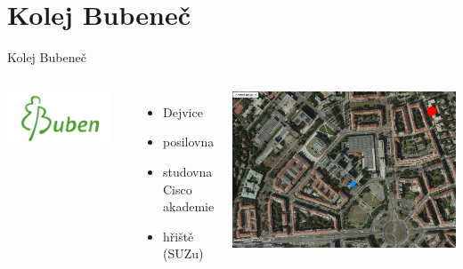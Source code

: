\documentclass{beamer}
\begin{document}
\section{Kolej Bubeneč}
\begin{frame}{Kolej Bubeneč}
	\begin{columns}[c]
			\begin{center}
				\includegraphics[width=0.9\textwidth]{logo_buk.png}
			\end{center}

			\begin{itemize}
				\item Dejvice
				\item posilovna
				\item studovna Cisco akademie
				\item hřiště (SUZu)
			\end{itemize}
			\begin{center}
				\includegraphics[width=\textwidth]{mapa_buk.png}
			\end{center}
	\end{columns}

\end{frame}
\end{document}
